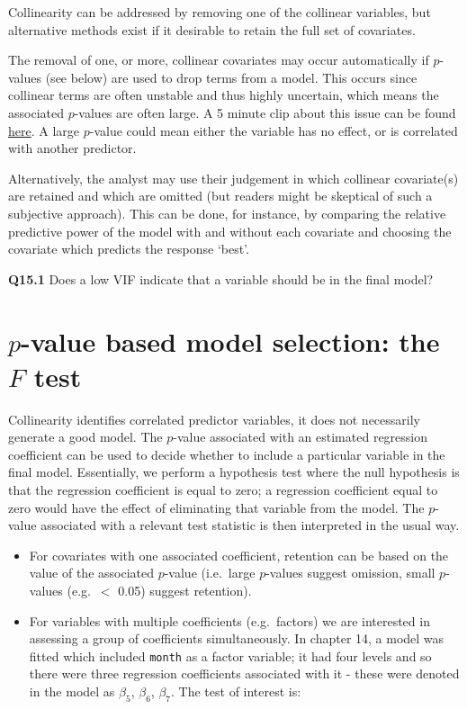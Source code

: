 \documentclass[
  oneside]{krantz}
\begin{document}
Collinearity can be addressed by removing one of the collinear variables, but alternative methods exist if it desirable to retain the full set of covariates.

The removal of one, or more, collinear covariates may occur automatically if \(p\)-values (see below) are used to drop terms from a model. This occurs since collinear terms are often unstable and thus highly uncertain, which means the associated \(p\)-values are often large. A 5 minute clip about this issue can be found \href{http://www.youtube.com/watch?v=O4jDva9B3fw}{here}.
A large \(p\)-value could mean either the variable has no effect, or is correlated with another predictor.

Alternatively, the analyst may use their judgement in which collinear covariate(s) are retained and which are omitted (but readers might be skeptical of such a subjective approach). This can be done, for instance, by comparing the relative predictive power of the model with and without each covariate and choosing the covariate which predicts the response `best'.

\textbf{Q15.1} Does a low VIF indicate that a variable should be in the final model?

\hypertarget{p-value-based-model-selection-the-f-test}{%
\section{\texorpdfstring{\(p\)-value based model selection: the \(F\) test}{p-value based model selection: the F test}}\label{p-value-based-model-selection-the-f-test}}

Collinearity identifies correlated predictor variables, it does not necessarily generate a good model. The \(p\)-value associated with an estimated regression coefficient can be used to decide whether to include a particular variable in the final model. Essentially, we perform a hypothesis test where the null hypothesis is that the regression coefficient is equal to zero; a regression coefficient equal to zero would have the effect of eliminating that variable from the model. The \(p\)-value associated with a relevant test statistic is then interpreted in the usual way.

\begin{itemize}
\item
  For covariates with one associated coefficient, retention can be based on the value of the associated \(p\)-value (i.e.~large \(p\)-values suggest omission, small \(p\)-values (e.g.~\(<\) 0.05) suggest retention).
\item
  For variables with multiple coefficients (e.g.~factors) we are interested in assessing a group of coefficients simultaneously. In chapter 14, a model was fitted which included \texttt{month} as a factor variable; it had four levels and so there were three regression coefficients associated with it - these were denoted in the model as \(\beta_5\), \(\beta_6\), \(\beta_7\). The test of interest is:
\end{itemize}
\end{document}
